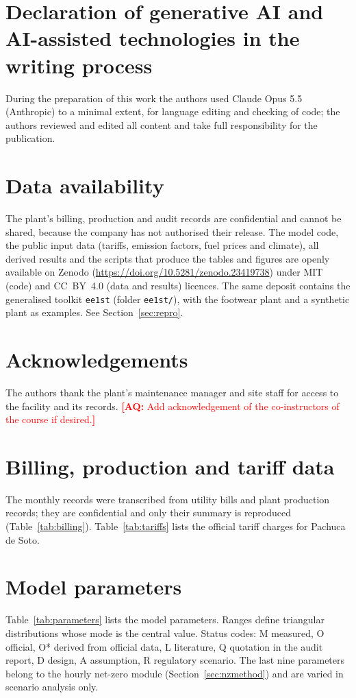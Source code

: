 \documentclass[preprint,12pt,authoryear]{elsarticle}
\newcommand{\AQ}[1]{\textcolor{red}{\textbf{[AQ:} #1\textbf{]}}}
\begin{document}
\section*{Declaration of generative AI and AI-assisted technologies in the writing process}
During the preparation of this work the authors used Claude Opus 5.5 (Anthropic) to a minimal extent, for language editing and checking of code; the authors reviewed and edited all content and take full responsibility for the publication.

\section*{Data availability}
The plant's billing, production and audit records are confidential and cannot be shared, because the company has not authorised their release. The model code, the public input data (tariffs, emission factors, fuel prices and climate), all derived results and the scripts that produce the tables and figures are openly available on Zenodo (\url{https://doi.org/10.5281/zenodo.23419738}) under MIT (code) and CC~BY~4.0 (data and results) licences. The same deposit contains the generalised toolkit \texttt{ee1st} (folder \texttt{ee1st/}), with the footwear plant and a synthetic plant as examples. See Section~\ref{sec:repro}.

\section*{Acknowledgements}
The authors thank the plant's maintenance manager and site staff for access to the facility and its records. \AQ{Add acknowledgement of the co-instructors of the course if desired.}

\appendix

\section{Billing, production and tariff data}
\label{app:data}
The monthly records were transcribed from utility bills and plant production records; they are confidential and only their summary is reproduced (Table~\ref{tab:billing}). Table~\ref{tab:tariffs} lists the official tariff charges for Pachuca de Soto.



\section{Model parameters}
\label{app:params}
Table~\ref{tab:parameters} lists the model parameters. Ranges define triangular distributions whose mode is the central value. Status codes: M measured, O official, O* derived from official data, L literature, Q quotation in the audit report, D design, A assumption, R regulatory scenario. The last nine parameters belong to the hourly net-zero module (Section~\ref{sec:nzmethod}) and are varied in scenario analysis only.

\end{document}
